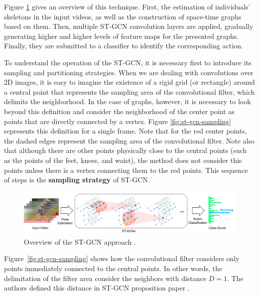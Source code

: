 Figure \ref{fig:st-gcn-workflow} gives an overview of this technique. First, the estimation of individuals' skeletons in the input videos, as well as the construction of space-time graphs based on them. Then, multiple ST-GCN convolution layers are applied, gradually generating higher and higher levels of feature maps for the presented graphs. Finally, they are submitted to a classifier to identify the corresponding action.

To understand the operation of the ST-GCN, it is necessary first to introduce its sampling and partitioning strategies. When we are dealing with convolutions over 2D images, it is easy to imagine the existence of a rigid grid (or rectangle) around a central point that represents the sampling area of the convolutional filter, which delimits the neighborhood. In the case of graphs, however, it is necessary to look beyond this definition and consider the neighborhood of the center point as points that are directly connected by a vertex. Figure \ref{fig:st-gcn-sampling} represents this definition for a single frame. Note that for the red center points, the dashed edges represent the sampling area of the convolutional filter. Note also that although there are other points physically close to the central points (such as the points of the feet, knees, and waist), the method does not consider this points unless there is a vertex connecting them to the red points. This sequence of steps is the \textbf{sampling strategy} of ST-GCN. %



\begin{figure}[!ht]
    \centering
    \includegraphics[width=1.0\textwidth]{images/st_gcn_workflow}
    \caption{Overview of the ST-GCN approach \cite[p. 3]{st-gcn-2018}.}
    \label{fig:st-gcn-workflow}
\end{figure}


Figure~\ref{fig:st-gcn-sampling} shows how the convolutional filter considers only points immediately connected to the central points. In other words, the delimitation of the filter area consider the neighbors with distance $D = 1$. The authors defined this distance in ST-GCN proposition paper \cite{st-gcn-2018}. 

